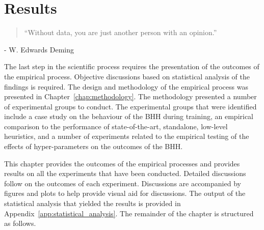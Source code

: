 \chapter{Results}
\label{chap:results}

\begin{quotation}
	\noindent ``Without data, you are just another person with an opinion.''
\end{quotation}
\begin{flushright}
	- W. Edwards Deming
\end{flushright}

The last step in the scientific process requires the presentation of the outcomes of the empirical process. Objective discussions based on statistical analysis of the findings is required. The design and methodology of the empirical process was presented in Chapter~\ref{chap:methodology}. The methodology presented a number of experimental groups to conduct. The experimental groups that were identified include a case study on the behaviour of the \acs{BHH} during training, an empirical comparison to the performance of state-of-the-art, standalone, low-level heuristics, and a number of experiments related to the empirical testing of the effects of hyper-parameters on the outcomes of the \acs{BHH}.

This chapter provides the outcomes of the empirical processes and provides results on all the experiments that have been conducted. Detailed discussions follow on the outcomes of each experiment. Discussions are accompanied by figures and plots to help provide visual aid for discussions. The output of the statistical analysis that yielded the results is provided in Appendix~\ref{app:statistical_analysis}. The remainder of the chapter is structured as follows.

